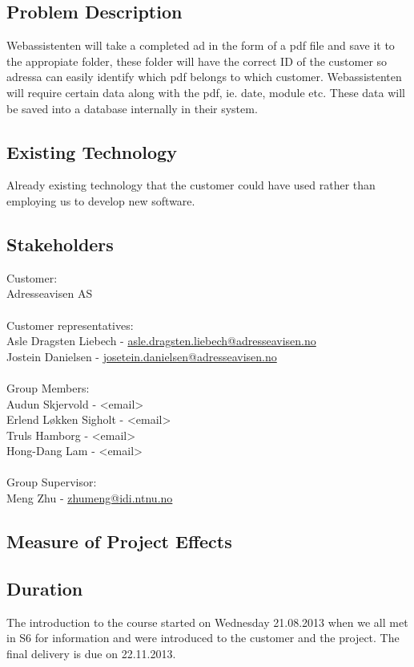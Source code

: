 \subsection{Problem Description}
Webassistenten will take a completed ad in the form of a pdf file and save it to the appropiate folder, these folder will have the correct ID of the customer so adressa can easily identify which pdf belongs to which customer.
Webassistenten will require certain data along with the pdf, ie. date, module etc. These data will be saved into a database internally in their system.

\subsection{Existing Technology}
Already existing technology that the customer could have used rather than employing us to develop new software.

\subsection{Stakeholders}
Customer:\\
Adresseavisen AS\\
\\
Customer representatives:\\
Asle Dragsten Liebech - \href{mailto://asle.dragsten.liebech@adresseavisen.no}{asle.dragsten.liebech@adresseavisen.no}\\
Jostein Danielsen - \href{mailto://josetein.danielsen@adresseavisen.no}{josetein.danielsen@adresseavisen.no}\\
\\
Group Members:\\
Audun Skjervold - <email>\\
Erlend Løkken Sigholt - <email>\\
Truls Hamborg - <email>\\
Hong-Dang Lam - <email>\\
\\
Group Supervisor:\\
Meng Zhu - \href{mailto://zhumeng@idi.ntnu.no}{zhumeng@idi.ntnu.no}
\\
\subsection{Measure of Project Effects}
\subsection{Duration}
The introduction to the course started on Wednesday 21.08.2013 when we all met in S6 for information and were introduced to the customer and the project.
The final delivery is due on 22.11.2013.